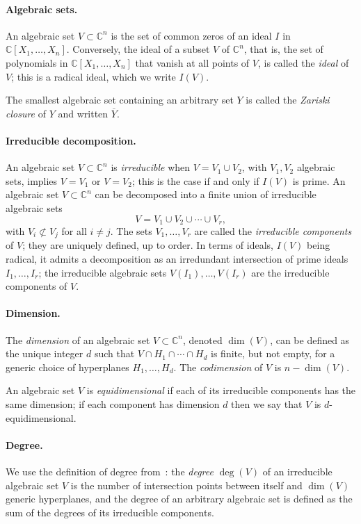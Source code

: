\documentclass[12pt]{article}
\def\C{\mathbb{C}}
\begin{document}
\paragraph*{Algebraic sets.} An algebraic set $V \subset \C^n$ is the set of common 
zeros of an ideal $I$ in $\C[X_1,\hdots,X_n].$ Conversely, the ideal
of a subset $V$ of $\C^n$, that is, the set of polynomials in
$\C[X_1,\dots,X_n]$ that vanish at all points of $V$, is called the
\textit{ideal} of $V$; this is a radical ideal, which we write $I(V)$.

The smallest algebraic set containing an arbitrary set $Y$ is called 
the {\em Zariski closure} of $Y$ and written $\overline Y$.

\paragraph*{Irreducible decomposition.}
An algebraic set $V \subset \C^n$ is \textit{irreducible} when $V =
V_1 \cup V_2$, with $V_1,V_2$ algebraic sets, implies $V=V_1$ or
$V=V_2$; this is the case if and only if $I(V)$ is prime.  An
algebraic set $V \subset \C^n$ can be decomposed into a finite union
of irreducible algebraic sets
\[
V = V_1 \cup V_2 \cup \cdots \cup V_r,
\]
with $V_i \not \subset V_j$ for all $i \ne j$. The sets
$V_1,\dots,V_r$ are called the {\em irreducible components} of $V$;
they are uniquely defined, up to order. In terms of ideals, $I(V)$
being radical, it admits a decomposition as an irredundant intersection
of prime ideals $I_1,\dots,I_r$; the irreducible algebraic sets
$V(I_1),\dots,V(I_r)$ are the irreducible components of $V$.

\paragraph*{Dimension.}
The \textit{dimension} of an algebraic set $V \subset \C^n$, denoted
$\dim(V)$, can be defined as the unique integer $d$ such that $V \cap
H_1 \cap \cdots \cap H_d$ is finite, but not empty, for a generic
choice of hyperplanes $H_1,\dots,H_d$. The \textit{codimension} of $V$
is $n - \dim (V)$. 

An algebraic set $V$ is \textit{equidimensional} if each of its
irreducible components has the same dimension; if each component has
dimension $d$ then we say that $V$ is $d$-equidimensional.

\paragraph*{Degree.}
We use the definition of degree from~\cite{H}: the \textit{degree}
$\deg(V)$ of an irreducible algebraic set $V$ is the number of
intersection points between itself and $\dim (V)$ generic hyperplanes,
and the degree of an arbitrary algebraic set is defined as the sum of
the degrees of its irreducible components.
\end{document}

